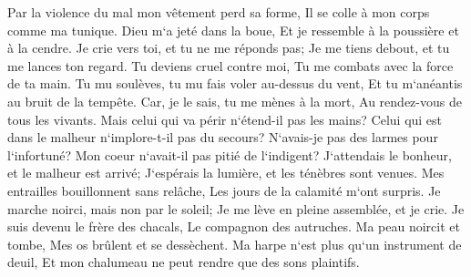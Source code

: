 \verse Par la violence du mal mon vêtement perd sa forme, Il se colle à mon corps comme ma tunique. 
\verse Dieu m`a jeté dans la boue, Et je ressemble à la poussière et à la cendre. 
\verse Je crie vers toi, et tu ne me réponds pas; Je me tiens debout, et tu me lances ton regard. 
\verse Tu deviens cruel contre moi, Tu me combats avec la force de ta main. 
\verse Tu mu soulèves, tu mu fais voler au-dessus du vent, Et tu m`anéantis au bruit de la tempête. 
\verse Car, je le sais, tu me mènes à la mort, Au rendez-vous de tous les vivants. 
\verse Mais celui qui va périr n`étend-il pas les mains? Celui qui est dans le malheur n`implore-t-il pas du secours? 
\verse N`avais-je pas des larmes pour l`infortuné? Mon coeur n`avait-il pas pitié de l`indigent? 
\verse J`attendais le bonheur, et le malheur est arrivé; J`espérais la lumière, et les ténèbres sont venues. 
\verse Mes entrailles bouillonnent sans relâche, Les jours de la calamité m`ont surpris. 
\verse Je marche noirci, mais non par le soleil; Je me lève en pleine assemblée, et je crie. 
\verse Je suis devenu le frère des chacals, Le compagnon des autruches. 
\verse Ma peau noircit et tombe, Mes os brûlent et se dessèchent. 
\verse Ma harpe n`est plus qu`un instrument de deuil, Et mon chalumeau ne peut rendre que des sons plaintifs. 

